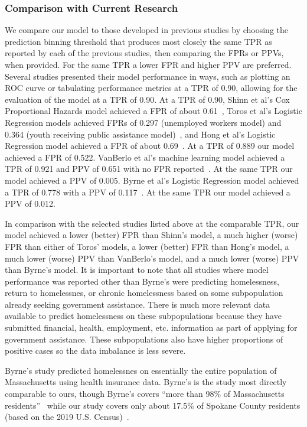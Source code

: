 \documentclass[10pt,letterpaper]{article}
\begin{document}
\subsubsection*{Comparison with Current Research}
We compare our model to those developed in previous studies by choosing the prediction binning threshold that produces most closely the same TPR as reported by each of the previous studies, then comparing the FPRs or PPVs, when provided. For the same TPR a lower FPR and higher PPV are preferred. Several studies presented their model performance in ways, such as plotting an ROC curve or tabulating performance metrics at a TPR of 0.90, allowing for the evaluation of the model at a TPR of 0.90. At a TPR of 0.90, Shinn et al's Cox Proportional Hazards model achieved a FPR of about 0.61~\cite{shinn2013efficient}, Toros et al's Logistic Regression models achieved FPRs of 0.297 (unemployed workers model) and 0.364 (youth receiving public assistance model)~\cite{toros2019early}, and Hong et al's Logistic Regression model achieved a FPR of about 0.69~\cite{hong2018applications}. At a TPR of 0.889 our model achieved a FPR of 0.522. VanBerlo et al's machine learning model achieved a TPR of 0.921 and PPV of 0.651 with no FPR reported~\cite{vanberlo2021interpretable}. At the same TPR our model achieved a PPV of 0.005. Byrne et al's Logistic Regression model achieved a TPR of 0.778 with a PPV of 0.117~\cite{byrne2020classification}. At the same TPR our model achieved a PPV of 0.012.

In comparison with the selected studies listed above at the comparable TPR, our model achieved a lower (better) FPR than Shinn's model, a much higher (worse) FPR than either of Toros' models, a lower (better) FPR than Hong's model, a much lower (worse) PPV than VanBerlo's model, and a much lower (worse) PPV than Byrne's model. It is important to note that all studies where model performance was reported other than Byrne's were predicting homelessness, return to homelessnes, or chronic homelessness based on some subpopulation already seeking government assistance. There is much more relevant data available to predict homelessness on these subpopulations because they have submitted financial, health, employment, etc. information as part of applying for government assistance. These subpopulations also have higher proportions of positive cases so the data imbalance is less severe.

Byrne's study predicted homelessnes on essentially the entire population of Massachusetts using health insurance data. Byrne's is the study most directly comparable to ours, though Byrne's covers ``more than 98\% of Massachusetts residents''~\cite{byrne2020classification} while our study covers only about 17.5\% of Spokane County residents (based on the 2019 U.S. Census)~\cite{SpokanePop}.
\end{document}
